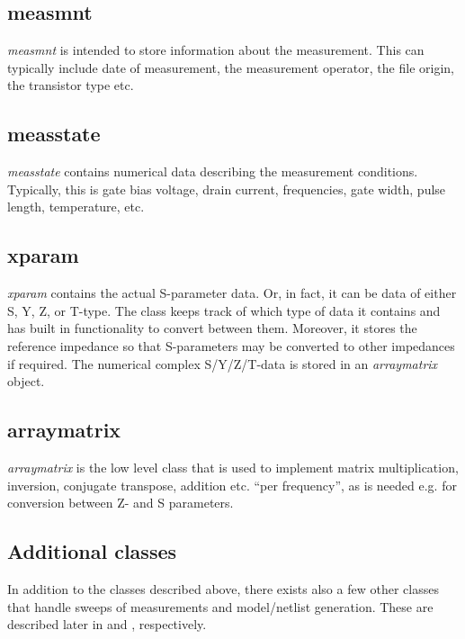 \subsection{measmnt}
\emph{measmnt} is intended to store information about the
measurement. This can typically include date of measurement, the
measurement operator, the file origin, the transistor type etc.

\subsection{measstate}
\emph{measstate} contains numerical data describing the
measurement conditions. Typically, this is gate bias voltage,
drain current, frequencies, gate width, pulse length, temperature,
etc.

\subsection{xparam}
\emph{xparam} contains the actual S-parameter data. Or, in fact,
it can be data of either S, Y, Z, or T-type. The class keeps track
of which type of data it contains and has built in functionality
to convert between them. Moreover, it stores the reference
impedance so that S-parameters may be converted to other
impedances if required. The numerical complex S/Y/Z/T-data is
stored in an \emph{arraymatrix} object.

\subsection{arraymatrix}
\emph{arraymatrix} is the low level class that is used to
implement matrix multiplication, inversion, conjugate transpose,
addition etc. ``per frequency'', as is needed e.g. for conversion
between Z- and S parameters.

\subsection{Additional classes}
In addition to the classes described above, there exists also a
few other classes that handle sweeps of measurements and
model/netlist generation. These are described later in
 and , respectively.
